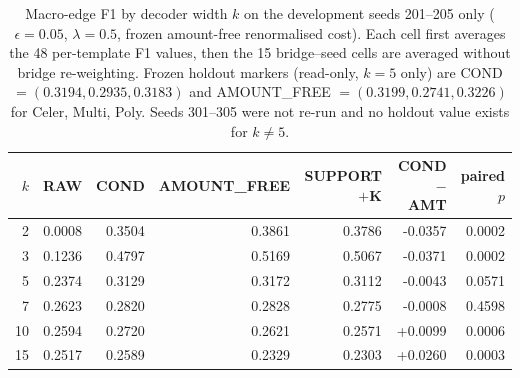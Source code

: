 \begin{table}[t]
\centering
\small
\begin{tabular}{rrrrrrr}
\hline
$k$ & RAW & COND & AMOUNT\_FREE & SUPPORT$+$K & COND $-$ AMT & paired $p$ \\
\hline
2 & 0.0008 & 0.3504 & 0.3861 & 0.3786 & -0.0357 & 0.0002 \\
3 & 0.1236 & 0.4797 & 0.5169 & 0.5067 & -0.0371 & 0.0002 \\
5 & 0.2374 & 0.3129 & 0.3172 & 0.3112 & -0.0043 & 0.0571 \\
7 & 0.2623 & 0.2820 & 0.2828 & 0.2775 & -0.0008 & 0.4598 \\
10 & 0.2594 & 0.2720 & 0.2621 & 0.2571 & +0.0099 & 0.0006 \\
15 & 0.2517 & 0.2589 & 0.2329 & 0.2303 & +0.0260 & 0.0003 \\
\hline
\end{tabular}
\caption{Macro-edge F1 by decoder width $k$ on the development seeds 201--205 only
($\epsilon = 0.05$, $\lambda = 0.5$, frozen amount-free renormalised cost).
Each cell first averages the 48 per-template F1 values, then the 15 bridge--seed cells are
averaged without bridge re-weighting. Frozen holdout markers (read-only, $k=5$ only) are
COND $= (0.3194, 0.2935, 0.3183)$ and AMOUNT\_FREE $= (0.3199, 0.2741, 0.3226)$ for
Celer, Multi, Poly. Seeds 301--305 were not re-run and no holdout value exists for
$k \neq 5$.}
\end{table}
